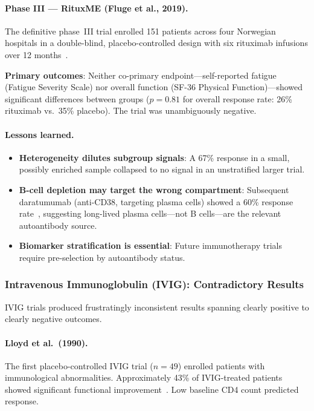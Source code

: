 \paragraph{Phase III --- RituxME (Fluge et al., 2019).}
The definitive phase~III trial enrolled 151 patients across four Norwegian hospitals in a double-blind, placebo-controlled design with six rituximab infusions over 12 months~\cite{Fluge2019}.

\textbf{Primary outcomes}: Neither co-primary endpoint---self-reported fatigue (Fatigue Severity Scale) nor overall function (SF-36 Physical Function)---showed significant differences between groups ($p = 0.81$ for overall response rate: 26\% rituximab vs.\ 35\% placebo). The trial was unambiguously negative.

\paragraph{Lessons learned.}
\begin{itemize}
    \item \textbf{Heterogeneity dilutes subgroup signals}: A 67\% response in a small, possibly enriched sample collapsed to no signal in an unstratified larger trial.
    \item \textbf{B-cell depletion may target the wrong compartment}: Subsequent daratumumab (anti-CD38, targeting plasma cells) showed a 60\% response rate~\cite{Fluge2025daratumumab}, suggesting long-lived plasma cells---not B cells---are the relevant autoantibody source.
    \item \textbf{Biomarker stratification is essential}: Future immunotherapy trials require pre-selection by autoantibody status.
\end{itemize}

\subsubsection{Intravenous Immunoglobulin (IVIG): Contradictory Results}

IVIG trials produced frustratingly inconsistent results spanning clearly positive to clearly negative outcomes.

\paragraph{Lloyd et al.\ (1990).}
The first placebo-controlled IVIG trial ($n = 49$) enrolled patients with immunological abnormalities. Approximately 43\% of IVIG-treated patients showed significant functional improvement~\cite{Lloyd1990}. Low baseline CD4 count predicted response.

